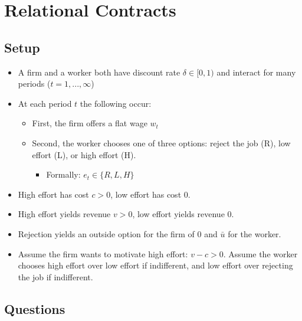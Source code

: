 \documentclass{article}
\begin{document}
\section{Relational Contracts}


\subsection{Setup}

\begin{itemize}
    \item A firm and a worker both have discount rate $\delta\in [0,1)$ and interact for many periods ($t=1,...,\infty$)
    \item At each period $t$ the following occur:
    \begin{itemize}
        \item First, the firm offers a flat wage $w_t$
        \item Second, the worker chooses one of three options: reject the job (R), low effort (L), or high effort (H).
        \begin{itemize}
            \item Formally: $e_t \in \{R,L,H\}$
        \end{itemize}
    \end{itemize}
    \item High effort has cost $c>0$, low effort has cost 0.
    \item High effort yields revenue $v>0$, low effort yields revenue 0.
    \item Rejection yields an outside option for the firm of 0 and $\bar u$ for the worker.
    \item Assume the firm wants to motivate high effort: $v-c>0$. Assume the worker chooses high effort over low effort if indifferent, and low effort over rejecting the job if indifferent.
\end{itemize}

\subsection{Questions}
\end{document}
